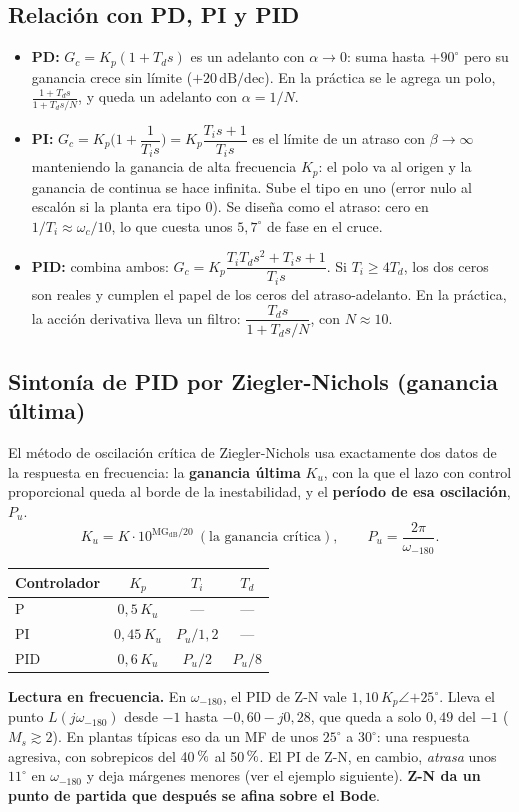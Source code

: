 \documentclass[11pt,a4paper]{article}
\newcounter{ejemplo}
\newcommand{\pct}{\ensuremath{\,\mathchar"7025}}
\newcommand{\dBdec}{\,\mathrm{dB/dec}}
\newcommand{\MG}{\mathrm{MG}}
\newcommand{\wc}{\omega_c}
\newcommand{\wf}{\omega_{-180}}
\begin{document}
\subsection{Relación con PD, PI y PID}
\begin{itemize}
\item \textbf{PD:} $G_c=K_p(1+T_ds)$ es un adelanto con $\alpha\to0$: suma hasta $+90^\circ$ pero su ganancia crece sin límite
      ($+20\dBdec$). En la práctica se le agrega un polo, $\frac{1+T_ds}{1+T_ds/N}$, y queda un adelanto con $\alpha=1/N$.
\item \textbf{PI:} $G_c=K_p\Big(1+\dfrac{1}{T_is}\Big)=K_p\dfrac{T_is+1}{T_is}$ es el límite de un atraso con $\beta\to\infty$
      manteniendo la ganancia de alta frecuencia $K_p$: el polo va al origen y la ganancia de continua se hace infinita.
      Sube el tipo en uno (error nulo al escalón si la planta era tipo 0). Se diseña como el atraso: cero en $1/T_i\approx\wc/10$,
      lo que cuesta unos $5{,}7^\circ$ de fase en el cruce.
\item \textbf{PID:} combina ambos: $G_c=K_p\dfrac{T_iT_ds^2+T_is+1}{T_is}$. Si $T_i\ge4T_d$, los dos ceros son reales y cumplen el papel de los ceros
      del atraso-adelanto. En la práctica, la acción derivativa lleva un filtro: $\dfrac{T_ds}{1+T_ds/N}$, con $N\approx10$.
\end{itemize}

\subsection{Sintonía de PID por Ziegler-Nichols (ganancia última)}
\label{sec:zn}
El método de oscilación crítica de Ziegler-Nichols usa exactamente dos datos de la respuesta en frecuencia: la \textbf{ganancia última}
$K_u$, con la que el lazo con control proporcional queda al borde de la inestabilidad, y el \textbf{período de esa oscilación}, $P_u$.
\[
K_u=K\cdot10^{\MG_{\mathrm{dB}}/20}\ (\text{la ganancia crítica}),\qquad P_u=\frac{2\pi}{\wf}.
\]
\begin{center}
\small
\begin{tabular}{@{}lccc@{}}
\toprule
Controlador & $K_p$ & $T_i$ & $T_d$\\
\midrule
P & $0{,}5\,K_u$ & --- & ---\\
PI & $0{,}45\,K_u$ & $P_u/1{,}2$ & ---\\
PID & $0{,}6\,K_u$ & $P_u/2$ & $P_u/8$\\
\bottomrule
\end{tabular}
\end{center}
\textbf{Lectura en frecuencia.} En $\wf$, el PID de Z-N vale $1{,}10\,K_p\angle{+25^\circ}$. Lleva el punto $L(j\wf)$ desde $-1$ hasta $-0{,}60-j0{,}28$,
que queda a solo $0{,}49$ del $-1$ ($M_s\gtrsim2$). En plantas típicas eso da un MF de unos $25^\circ$ a $30^\circ$: una respuesta agresiva, con sobrepicos
del 40\pct{} al 50\pct{}. El PI de Z-N, en cambio, \emph{atrasa} unos $11^\circ$ en $\wf$ y deja márgenes menores (ver el ejemplo siguiente).
\textbf{Z-N da un punto de partida que después se afina sobre el Bode}.
\end{document}
